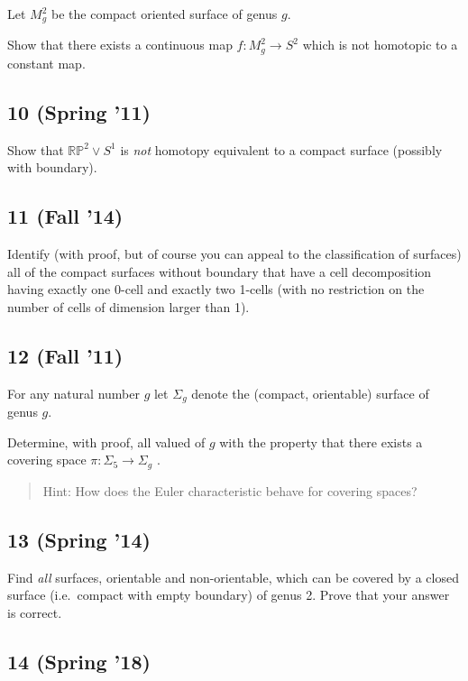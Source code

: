 Let \(M_g^2\) be the compact oriented surface of genus \(g\).

Show that there exists a continuous map \(f : M_g^2 \to S^2\) which is
not homotopic to a constant map.

\hypertarget{spring-11-3}{%
\subsection{10 (Spring '11)}\label{spring-11-3}}

Show that \({\mathbb{RP}}^2 \lor S^1\) is \emph{not} homotopy equivalent
to a compact surface (possibly with boundary).

\hypertarget{fall-14-6}{%
\subsection{11 (Fall '14)}\label{fall-14-6}}

Identify (with proof, but of course you can appeal to the classification
of surfaces) all of the compact surfaces without boundary that have a
cell decomposition having exactly one 0-cell and exactly two 1-cells
(with no restriction on the number of cells of dimension larger than 1).

\hypertarget{fall-11-3}{%
\subsection{12 (Fall '11)}\label{fall-11-3}}

For any natural number \(g\) let \(\Sigma_g\) denote the (compact,
orientable) surface of genus \(g\).

Determine, with proof, all valued of \(g\) with the property that there
exists a covering space \(\pi : \Sigma_5 \to \Sigma_g\) .

\begin{quote}
Hint: How does the Euler characteristic behave for covering spaces?
\end{quote}

\hypertarget{spring-14-2}{%
\subsection{13 (Spring '14)}\label{spring-14-2}}

Find \emph{all} surfaces, orientable and non-orientable, which can be
covered by a closed surface (i.e.~compact with empty boundary) of genus
2. Prove that your answer is correct.

\hypertarget{spring-18-3}{%
\subsection{14 (Spring '18)}\label{spring-18-3}}

